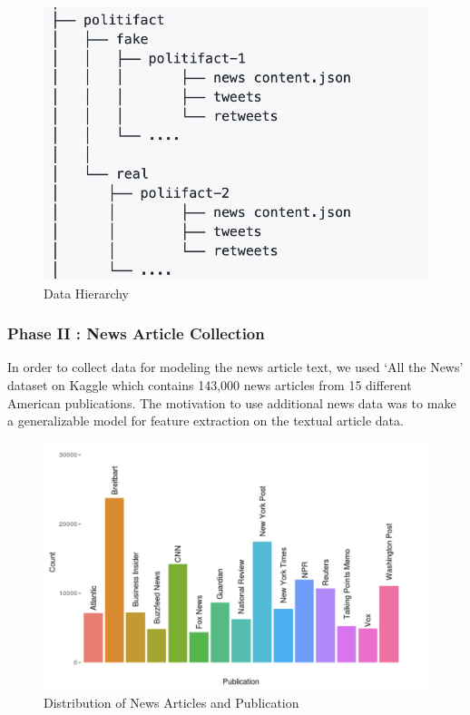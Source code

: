 \documentclass{article}
\begin{document}
\begin{figure}[H]
    \centering
    \includegraphics[scale=0.5]{NeuRIPS2019/fakenews.png}
    \caption{Data Hierarchy}
    \label{Data Hierarchy}
\end{figure}
\subsubsection{Phase II : News Article Collection}
In order to collect data for modeling the news article text, we used ‘All the News’ dataset on Kaggle \cite{allnewsdata} which contains 143,000 news articles from 15 different American publications. 
The motivation to use additional news data was to make a generalizable model for feature extraction on the textual article data.

\begin{figure}[H]
    \centering
    \includegraphics[scale=0.5]{NeuRIPS2019/all-the-news.png}
    \caption{Distribution of News Articles and Publication}
    \label{Distribution of News Articles and Publication}
\end{figure}
\end{document}
